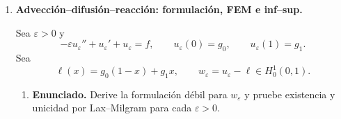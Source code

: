 \documentclass[11pt]{article}
\newcommand{\norm}[1]{\left\lVert #1\right\rVert}
\newcommand{\abs}[1]{\left|#1\right|}
\def\vec   #1{\mbox{\boldmath $#1$}{}}
\begin{document}
\begin{enumerate}[label=\textbf{\arabic*.}, leftmargin=*]
\begin{enumerate}[label=(\alph*), leftmargin=*]
    \textbf{Solución.} Primero estimamos el funcional $L$. Por continuidad de $a$,
    \[
    \begin{aligned}
        \abs{L(\vec w)}
        &\le
        \norm{\vec f}_{H^{-1}}\norm{\vec w}_{H^1}
        +\abs{a(\vec v_g,\vec w)}\\
        &\le
        \left(\norm{\vec f}_{H^{-1}}+C\norm{\vec v_g}_{H^1}\right)
        \norm{\vec w}_{H^1}.
    \end{aligned}
    \]
    Por tanto,
    \[
        \norm{L}_{V'}
        \le
        C\left(\norm{\vec f}_{H^{-1}}+
\norm{\vec v_g}_{H^1}\right).
    \]
    Tomando $\vec w=\vec u$ en la primera ecuación y $q=p$ en la segunda,
    \[
        b(\vec u,p)=0,
    \]
    y entonces
    \[
        a(\vec u,\vec u)=L(\vec u).
    \]
    Por coercividad,
    \[
        c\norm{\vec u}_{H^1}^2
        \le
        \norm{L}_{V'}\norm{\vec u}_{H^1},
    \]
    luego
    \[
        \norm{\vec u}_{H^1}
        \le
        C\norm{L}_{V'}.
    \]
    Para la presión, de la primera ecuación,
    \[
        b(\vec w,p)=L(\vec w)-a(\vec u,\vec w).
    \]
    Usando inf--sup,
    \[
    \begin{aligned}
        \beta\norm{p}_{L^2}
        &\le
        \sup_{\vec w\in V\setminus\{\vec0\}}
        \frac{\abs{b(\vec w,p)}}{\norm{\vec w}_{H^1}}\\
        &\le
        \norm{L}_{V'}+C\norm{\vec u}_{H^1}
        \le
        C\norm{L}_{V'}.
    \end{aligned}
    \]
    Combinando las cotas,
    \[
        \norm{\vec u}_{H^1(\Omega)}+
\norm{p}_{L^2(\Omega)}
        \le
        C\left(\norm{\vec f}_{H^{-1}(\Omega)}+
\norm{\vec v_g}_{H^1(\Omega)}\right).
    \]
\end{enumerate}

\item \textbf{Advección--difusión--reacción: formulación, FEM e inf--sup.}

Sea $\varepsilon>0$ y
\[
    -\varepsilon u_\varepsilon''+u_\varepsilon'+u_\varepsilon=f,
    \qquad
    u_\varepsilon(0)=g_0,
    \qquad
    u_\varepsilon(1)=g_1.
\]
Sea
\[
    \ell(x)=g_0(1-x)+g_1x,
    \qquad
    w_\varepsilon=u_\varepsilon-\ell\in H^1_0(0,1).
\]

\begin{enumerate}[label=(\alph*), leftmargin=*]
    \item \textbf{Enunciado.} Derive la formulación débil para $w_\varepsilon$ y pruebe existencia y unicidad por Lax--Milgram para cada $\varepsilon>0$.


\end{enumerate}
\end{enumerate}
\end{document}

